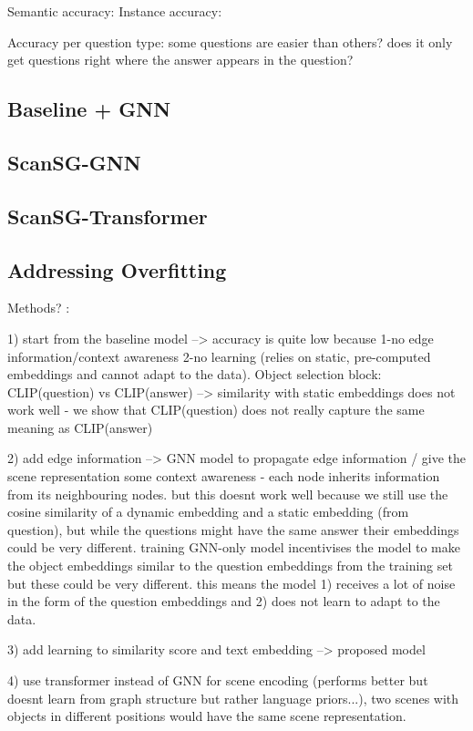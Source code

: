 Semantic accuracy:
Instance accuracy:

Accuracy per question type:
some questions are easier than others?
does it only get questions right where the answer appears in the question?


\subsection{Baseline + GNN}

\subsection{ScanSG-GNN}

\subsection{ScanSG-Transformer}

\subsection{Addressing Overfitting}


Methods? :

1) start from the baseline model --> accuracy is quite low because 1-no edge information/context awareness 2-no learning (relies on static, pre-computed embeddings and cannot adapt to the data). Object selection block: CLIP(question) vs CLIP(answer) --> similarity with static embeddings does not work well - we show that CLIP(question) does not really capture the same meaning as CLIP(answer)

2) add edge information --> GNN model to propagate edge information / give the scene representation some context awareness - each node inherits information from its neighbouring nodes. but this doesnt work well because we still use the cosine similarity of a dynamic embedding and a static embedding (from question), but while the questions might have the same answer their embeddings could be very different. training GNN-only model incentivises the model to make the object embeddings  similar to the question embeddings from the training set but these could be very different. this means the model 1) receives a lot of noise in the form of the question embeddings and 2) does not learn to adapt to the data.

3) add learning to similarity score and text embedding --> proposed model

4) use transformer instead of GNN for scene encoding (performs better but doesnt learn from graph structure but rather language priors...), two scenes with objects in different positions would have the same scene representation.


